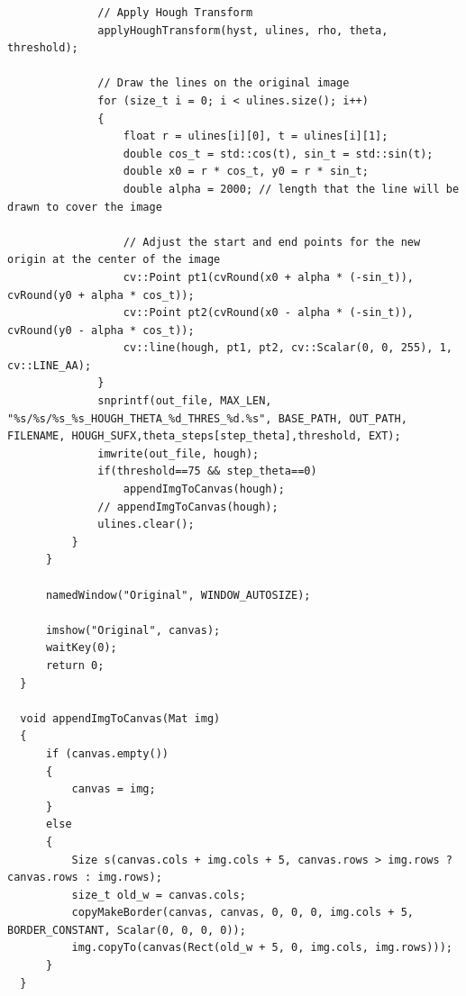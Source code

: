 \documentclass[12pt,a4paper]{report}
\begin{document}
\begin{lstlisting}
              // Apply Hough Transform
              applyHoughTransform(hyst, ulines, rho, theta, threshold);
  
              // Draw the lines on the original image
              for (size_t i = 0; i < ulines.size(); i++)
              {
                  float r = ulines[i][0], t = ulines[i][1];
                  double cos_t = std::cos(t), sin_t = std::sin(t);
                  double x0 = r * cos_t, y0 = r * sin_t;
                  double alpha = 2000; // length that the line will be drawn to cover the image
  
                  // Adjust the start and end points for the new origin at the center of the image
                  cv::Point pt1(cvRound(x0 + alpha * (-sin_t)), cvRound(y0 + alpha * cos_t));
                  cv::Point pt2(cvRound(x0 - alpha * (-sin_t)), cvRound(y0 - alpha * cos_t));
                  cv::line(hough, pt1, pt2, cv::Scalar(0, 0, 255), 1, cv::LINE_AA);
              }
              snprintf(out_file, MAX_LEN, "%s/%s/%s_%s_HOUGH_THETA_%d_THRES_%d.%s", BASE_PATH, OUT_PATH, FILENAME, HOUGH_SUFX,theta_steps[step_theta],threshold, EXT);
              imwrite(out_file, hough);
              if(threshold==75 && step_theta==0)
                  appendImgToCanvas(hough);
              // appendImgToCanvas(hough);
              ulines.clear();
          }
      }
  
      namedWindow("Original", WINDOW_AUTOSIZE);
  
      imshow("Original", canvas);
      waitKey(0);
      return 0;
  }
  
  void appendImgToCanvas(Mat img)
  {
      if (canvas.empty())
      {
          canvas = img;
      }
      else
      {
          Size s(canvas.cols + img.cols + 5, canvas.rows > img.rows ? canvas.rows : img.rows);
          size_t old_w = canvas.cols;
          copyMakeBorder(canvas, canvas, 0, 0, 0, img.cols + 5, BORDER_CONSTANT, Scalar(0, 0, 0, 0));
          img.copyTo(canvas(Rect(old_w + 5, 0, img.cols, img.rows)));
      }
  }  
\end{lstlisting}
\end{document}
